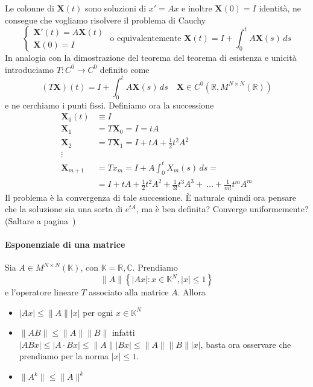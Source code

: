 Le colonne di \(\mathbf{X} {(t)}\) sono soluzioni di \(x' = Ax\) e inoltre
\(\mathbf{X} {(0)} = I\) identità, ne consegue che vogliamo risolvere il
problema di Cauchy
\begin{equation}\label{eq:cauchy_autonomo_omoglin}
    \begin{cases}
        \mathbf{X}'{(t)} = A\mathbf{X} {(t)} \\
        \mathbf{X} {(0)} = I 
    \end{cases}
    \text{ o equivalentemente }
    \mathbf{X} {(t)} = I + \int_{0}^{t} A\mathbf{X} {(s)}\,ds
\end{equation}
In analogia con la dimostrazione del teorema del teorema di esistenza e unicità
introduciamo \(T : C^{0} \to C^{0}\) definito come
\[
    (T\mathbf{X}){(t)} = I + \int_{0}^{t} A\mathbf{X} {(s)}\,ds \quad \mathbf{X}
    \in C^{0}{(\mathbb{R}, M^{N \times N}{(\mathbb{R})})}
\]
e ne cerchiamo i punti fissi. Definiamo ora la successione
\begin{align*}
    \mathbf{X}_0{(t)} &\equiv I \\
    \mathbf{X}_1 &= T\mathbf{X}_0 = I = tA \\
    \mathbf{X}_2 &= T\mathbf{X}_1 = I + tA + \frac{1}{2}t^2A^2 \\
    \vdots \\
    \mathbf{X}_{m+1} &= Tx_{m} = I + A \int_{0}^{t} X_{m} {(s)}\,ds = \\ &= I + tA +
    \frac{1}{2}t^2 A^2 + \frac{1}{3!}t^3 A^3 +~\dots + \frac{1}{m!}t^m A^m
\end{align*}
Il problema è la convergenza di tale successione. È naturale quindi ora
pensare che la soluzione sia una sorta di \(e^{tA}\), ma è ben definita?
Converge uniformemente? (Saltare a pagina~)

\paragraph{Esponenziale di una matrice} Sia \(A \in M^{N \times
N}{(\mathbb{K})}\), con \(\mathbb{K} = \mathbb{R}, \mathbb{C}\). Prendiamo 
\[
    \|A\| \left\{ |Ax| : x \in \mathbb{K}^{N}, |x| \le 1 \right\} 
\]
e l'operatore lineare \(T\) associato alla matrice \(A\). Allora
\begin{itemize}[label = --]
    \item \(|Ax| \le \|A\||x|\) per ogni \(x \in \mathbb{K}^{N}\)
    \item \(\|AB\| \le \|A\|\|B\|\) infatti \(|ABx| \le |A\cdot Bx| \le
        \|A\||Bx| \le \|A\|\|B\||x|\), basta ora osservare che prendiamo per la
        norma \(|x| \le 1\).
    \item \(\|A^{k}\| \le \|A\|^{k}\) 
\end{itemize}

